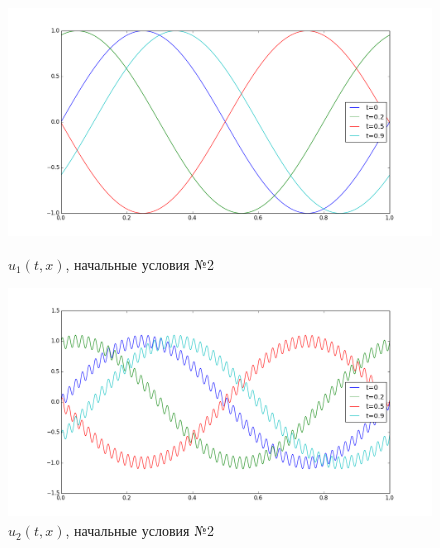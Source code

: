 \documentclass[titlepage]{article}
\begin{document}
\begin{figure}[h]
\begin{minipage}{.5\textwidth}
  \centering
  \includegraphics[width = \textwidth]{2_1.png}
  \caption{$u_1(t,x)$, начальные условия №2}
  \label{fig:test1}
\end{minipage}%
\begin{minipage}{.5\textwidth}
  \centering
  \includegraphics[width = \textwidth]{2_2.png}
  \caption{$u_2(t,x)$, начальные условия №2}
\end{minipage}


\end{figure}
\end{document}
